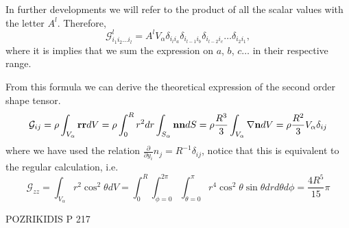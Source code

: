 In further developments we will refer to the product of all the scalar values with the letter $A^l$. 
Therefore, 
\begin{equation}
    \mathcal{G}_{i_1i_2\ldots i_l}^l 
    = A^l V_\alpha
    \delta_{i_l i_a}
    \delta_{i_{l-1} i_b}
    \delta_{i_{l-2} i_c}
    \ldots
    \delta_{i_2i_1},
    \label{eq:shapeT}
\end{equation}
where it is implies that we sum the expression on $a$, $b$, $c\ldots$ in their respective range. 

From this formula we can derive the theoretical expression of the second order shape tensor. 
\begin{equation*}
    \mathcal{G}_{ij} 
    = \rho \int_{V_\alpha} \textbf{r} \textbf{r} dV 
    = \rho \int_0^R r^2 dr \int_{S_\alpha} \textbf{n} \textbf{n}  dS 
    = \rho \frac{R^3}{3} \int_{V_\alpha} \mathbf{\nabla} \textbf{n} dV
    = \rho \frac{R^2}{3} V_\alpha \delta_{ij}
\end{equation*}
where we have used the relation $\frac{\partial}{\partial y_i}n_j = R^{-1} \delta_{ij}$, notice that this is equivalent to the regular calculation, i.e. 
\begin{equation*}
    \mathcal{G}_{zz} 
    = \int_{V_\alpha} r^2 \cos^2{\theta} dV 
    = \int_{0}^R \int_{\phi = 0}^{2\pi} \int_{\theta = 0}^{\pi} r^4 \cos^2{\theta} \sin{\theta} drd\theta d\phi
    = \frac{4R^5}{15}\pi
\end{equation*}

POZRIKIDIS P 217 

